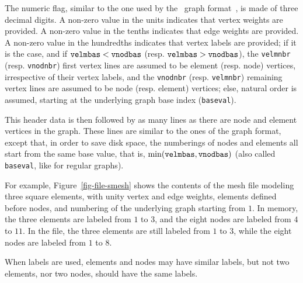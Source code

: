 The numeric flag, similar to the one used by the \chaco\ graph
format~\cite{hele93c}, is made of three decimal digits.  A non-zero
value in the units indicates that vertex weights are provided.  A
non-zero value in the tenths indicates that edge weights are provided.
A non-zero value in the hundredths indicates that vertex labels are
provided; if it is the case, and if
$\mbox{\texttt{velm}}\-\mbox{\texttt{bas}} <
\mbox{\texttt{vnod}}\-\mbox{\texttt{bas}}$
(resp\@. $\mbox{\texttt{velm}}\-\mbox{\texttt{bas}} >
\mbox{\texttt{vnod}}\-\mbox{\texttt{bas}}$), the \texttt{velmnbr}
(resp\@. \texttt{vnodnbr}) first vertex lines are assumed to be element
(resp\@. node) vertices, irrespective of their vertex labels, and the
\texttt{vnodnbr} (resp\@. \texttt{velmnbr}) remaining vertex lines are
assumed to be node (resp\@. element) vertices; else, natural order is
assumed, starting at the underlying graph base index (\texttt{baseval}).

This header data is then followed by as many lines as there are
node and element vertices in the graph. These lines are similar
to the ones of the graph format, except that, in order to save
disk space, the numberings of nodes and elements all start from
the same base value, that is,
$\min(\mbox{\texttt{velm}}\-\mbox{\texttt{bas}},
\mbox{\texttt{vnod}}\-\mbox{\texttt{bas}})$ (also called
\texttt{baseval}, like for regular graphs).

For example, Figure~\ref{fig-file-smesh} shows the contents of the
mesh file modeling three square elements, with unity vertex and edge
weights, elements defined before nodes, and numbering of the
underlying graph starting from $1$. In memory, the three elements are
labeled from $1$ to $3$, and the eight nodes are labeled from $4$ to
$11$. In the file, the three elements are still labeled from $1$ to $3$,
while the eight nodes are labeled from $1$ to $8$.

When labels are used, elements and nodes may have similar labels,
but not two elements, nor two nodes, should have the same labels.

